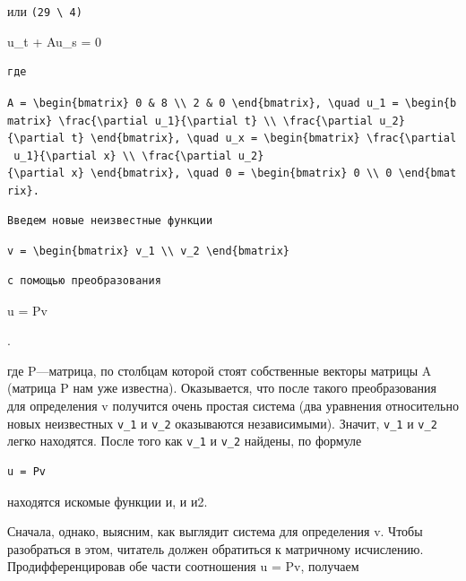 \documentclass[
  ukrainian,
]{article}
\begin{document}
или \texttt{(29\ \textbackslash{}\ 4)}

u\_t + Au\_s = 0

\begin{verbatim}
где
\end{verbatim}

\texttt{A\ =\ \textbackslash{}begin\{bmatrix\}\ 0\ \&\ 8\ \textbackslash{}\textbackslash{}\ 2\ \&\ 0\ \textbackslash{}end\{bmatrix\},\ \textbackslash{}quad\ u\_1\ =\ \textbackslash{}begin\{bmatrix\}\ \textbackslash{}frac\{\textbackslash{}partial\ u\_1\}\{\textbackslash{}partial\ t\}\ \textbackslash{}\textbackslash{}\ \textbackslash{}frac\{\textbackslash{}partial\ u\_2\}\{\textbackslash{}partial\ t\}\ \textbackslash{}end\{bmatrix\},\ \textbackslash{}quad\ u\_x\ =\ \textbackslash{}begin\{bmatrix\}\ \textbackslash{}frac\{\textbackslash{}partial\ u\_1\}\{\textbackslash{}partial\ x\}\ \textbackslash{}\textbackslash{}\ \textbackslash{}frac\{\textbackslash{}partial\ u\_2\}\{\textbackslash{}partial\ x\}\ \textbackslash{}end\{bmatrix\},\ \textbackslash{}quad\ 0\ =\ \textbackslash{}begin\{bmatrix\}\ 0\ \textbackslash{}\textbackslash{}\ 0\ \textbackslash{}end\{bmatrix\}.}

\begin{verbatim}
Введем новые неизвестные функции
\end{verbatim}

\texttt{v\ =\ \textbackslash{}begin\{bmatrix\}\ v\_1\ \textbackslash{}\textbackslash{}\ v\_2\ \textbackslash{}end\{bmatrix\}}

\begin{verbatim}
с помощью преобразования
\end{verbatim}

u = Pv

.

где P---матрица, по столбцам которой стоят собственные векторы матрицы A
(матрица P нам уже известна). Оказывается, что после такого
преобразования для определения v получится очень простая система (два
уравнения относительно новых неизвестных \texttt{v\_1} и \texttt{v\_2}
оказываются независимыми). Значит, \texttt{v\_1} и \texttt{v\_2} легко
находятся. После того как \texttt{v\_1} и \texttt{v\_2} найдены, по
формуле

\begin{verbatim}
u = Pv
\end{verbatim}

находятся искомые функции и, и и2.

Сначала, однако, выясним, как выглядит система для определения v. Чтобы
разобраться в этом, читатель должен обратиться к матричному исчислению.
Продифференцировав обе части соотношения u = Pv, получаем
\end{document}
